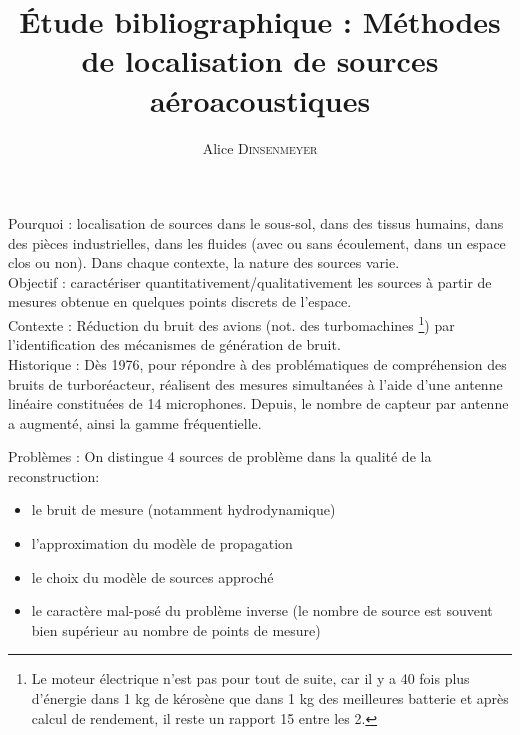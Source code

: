 \documentclass[twocolumn, 11pt]{article}
\title{
\centering \fontsize{18pt}{10pt}\textbf{Étude bibliographique : Méthodes de localisation de sources aéroacoustiques}
}
\author{
\large{Alice \textsc{Dinsenmeyer}}\\[2mm] %
\vspace{-5mm}
}
\date{}
\begin{document}
\maketitle %

\thispagestyle{fancy} %




Pourquoi : localisation de sources dans le sous-sol, dans des tissus humains, dans des pièces industrielles, dans les fluides (avec ou sans écoulement, dans un espace clos ou non). Dans chaque contexte, la nature des sources varie.\\

Objectif : caractériser quantitativement/qualitativement les sources à partir de mesures obtenue en quelques points  discrets de l'espace.\\

Contexte : Réduction du bruit des avions (not. des turbomachines \footnote{Le moteur électrique n'est pas pour tout de suite, car il y a 40 fois plus d'énergie dans 1 kg de kérosène que dans 1 kg des meilleures batterie et après calcul de rendement, il reste un rapport 15 entre les 2.}) par l'identification des mécanismes de génération de bruit.\\

Historique : Dès 1976, pour répondre à des problématiques de compréhension des bruits de turboréacteur, \cite{Billingsley1976} réalisent des mesures simultanées à l'aide d'une antenne linéaire constituées de 14 microphones. Depuis, le nombre de capteur par antenne a augmenté, ainsi la gamme fréquentielle.

Problèmes : On distingue 4 sources de problème dans la qualité de la reconstruction:\\
\begin{itemize}
	\item le bruit de mesure (notamment hydrodynamique)
	\item l'approximation du modèle de propagation
	\item le choix du modèle de sources approché
	\item le caractère mal-posé du problème inverse (le nombre de source est souvent bien supérieur au nombre de points de mesure)
\end{itemize}
\end{document}
